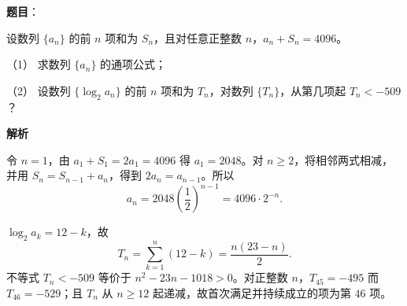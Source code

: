 \begin{answer}

\textbf{题目}：

设数列 $\{a_n\}$ 的前 $n$ 项和为 $S_n$，且对任意正整数 $n$，$a_n+S_n=4096$。

（1） 求数列 $\{a_n\}$ 的通项公式；

（2） 设数列 $\{\log_2a_n\}$ 的前 $n$ 项和为 $T_n$，对数列 $\{T_n\}$，从第几项起 $T_n<-509$？

\textbf{解析}


令 $n=1$，由 $a_1+S_1=2a_1=4096$ 得 $a_1=2048$。对 $n\ge2$，将相邻两式相减，并用 $S_n=S_{n-1}+a_n$，得到 $2a_n=a_{n-1}$。所以
\nopagebreak[4]
\[
a_n=2048\left(\frac12\right)^{n-1}=4096\cdot2^{-n}.
\]


$\log_2a_k=12-k$，故
\nopagebreak[4]
\[
T_n=\sum_{k=1}^n(12-k)=\frac{n(23-n)}2.
\]
不等式 $T_n<-509$ 等价于 $n^2-23n-1018>0$。对正整数 $n$，$T_{45}=-495$ 而 $T_{46}=-529$；且 $T_n$ 从 $n\ge12$ 起递减，故首次满足并持续成立的项为第 $46$ 项。



\end{answer}
